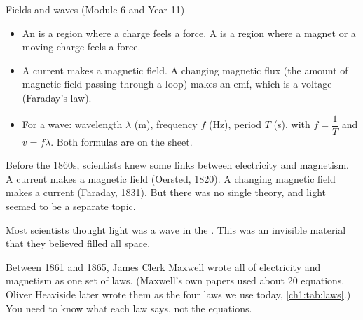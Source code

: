 \begin{keywords}
\end{keywords}

\begin{refresher}{Fields and waves (Module 6 and Year 11)}
\begin{itemize}
  \item An  is a region where a charge feels a force. A  is a region where a magnet or a moving charge feels a force.
  \item A current makes a magnetic field. A changing magnetic flux (the amount of magnetic
        field passing through a loop) makes an emf, which is a voltage (Faraday's law).
  \item For a wave: wavelength $\lambda$ (\si{m}), frequency $f$ (\si{Hz}), period $T$
        (\si{s}), with $f = \dfrac{1}{T}$ and $v = f\lambda$. Both formulas are on the sheet.
\end{itemize}
\end{refresher}

Before the 1860s, scientists knew some links between electricity and magnetism. A current makes
a magnetic field (Oersted, 1820). A changing magnetic field makes a current (Faraday, 1831). But
there was no single theory, and light seemed to be a separate topic.

Most scientists thought light was a wave in the . This was an
invisible material that they believed filled all space.

Between 1861 and 1865, James Clerk Maxwell wrote all of electricity and magnetism as one set of
laws. (Maxwell's own papers used about 20 equations. Oliver Heaviside later wrote them as the
four laws we use today, \cref{ch1:tab:laws}.) You need to know what each law says, not the
equations.

